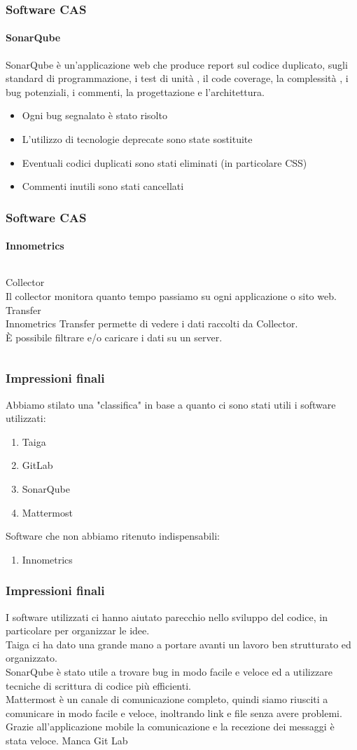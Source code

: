 \documentclass{beamer}
\begin{document}
\begin{frame}
\frametitle{Software CAS}
\framesubtitle{SonarQube}
SonarQube è un’applicazione web che produce report sul codice duplicato, sugli standard di programmazione, i test di unità , il code coverage, la complessità , i bug potenziali, i commenti, la progettazione e l’architettura.
  \begin{itemize}
	\item Ogni bug segnalato è stato risolto
	\item L'utilizzo di tecnologie deprecate sono state sostituite
	\item Eventuali codici duplicati sono stati eliminati (in particolare CSS)
	\item Commenti inutili sono stati cancellati
  \end{itemize}
\end{frame}

\begin{frame}
\frametitle{Software CAS}
\framesubtitle{Innometrics}
\begin{columns}
Collector\\
Il collector monitora quanto tempo passiamo su ogni applicazione o sito web.
Transfer\\
Innometrics Transfer permette di vedere i dati raccolti da Collector.\\
È possibile filtrare e/o caricare i dati su un server.
\end{columns}
\end{frame}

\begin{frame}
\frametitle{Impressioni finali}
Abbiamo stilato una "classifica" in base a quanto ci sono stati utili i software utilizzati:
  \begin{enumerate}
	\item Taiga
	\item GitLab
	\item SonarQube
	\item Mattermost
  \end{enumerate}
  Software che non abbiamo ritenuto indispensabili:
  \begin{enumerate}
	\item Innometrics
  \end{enumerate}
\end{frame}

\begin{frame}
\frametitle{Impressioni finali}
I software utilizzati ci hanno aiutato parecchio nello sviluppo del codice, in particolare per organizzar le idee.\\
Taiga ci ha dato una grande mano a portare avanti un lavoro ben strutturato ed organizzato.\\
SonarQube è stato utile a trovare bug in modo facile e veloce ed a utilizzare tecniche di scrittura di codice più efficienti.\\
Mattermost è un canale di comunicazione completo, quindi siamo riusciti a comunicare in modo facile e veloce, inoltrando link e file senza avere problemi. Grazie all'applicazione mobile la comunicazione e la recezione dei messaggi è stata veloce.
Manca Git Lab
\end{frame}
\end{document}
